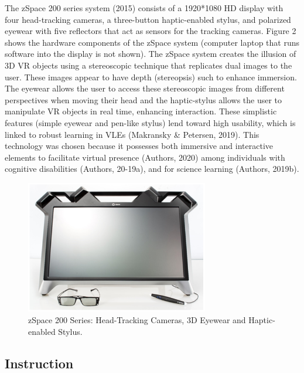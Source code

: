 \documentclass[11.5pt]{sig-alternate} %
\begin{document}
\begin{large}
The zSpace 200 series system (2015) consists of a 1920*1080 HD display with four head-tracking cameras, a three-button haptic-enabled stylus, and polarized eyewear with five reflectors that act as sensors for the tracking cameras. Figure 2 shows the hardware components of the zSpace system (computer laptop that runs software into the display is not shown). The zSpace system creates the illusion of 3D VR objects using a stereoscopic technique that replicates dual images to the user. These images appear to have depth (stereopsis) such to enhance immersion. The eyewear allows the user to access these stereoscopic images from different perspectives when moving their head and the haptic-stylus allows the user to manipulate VR objects in real time, enhancing interaction. These simplistic features (simple eyewear and pen-like stylus) lend toward high usability, which is linked to robust learning in VLEs (Makransky \& Petersen, 2019). This technology was chosen because it possesses both immersive and interactive elements to facilitate virtual presence (Authors, 2020) among individuals with cognitive disabilities (Authors, 20-19a), and for science learning (Authors, 2019b).   

\begin{figure}[h]
    \centering
    \includegraphics[width=8cm]{Figure 2.png}
    \caption{zSpace 200 Series: Head-Tracking Cameras, 3D Eyewear and Haptic-enabled Stylus.}
\end{figure}

\subsection*{Instruction}


\end{large}
\end{document}
